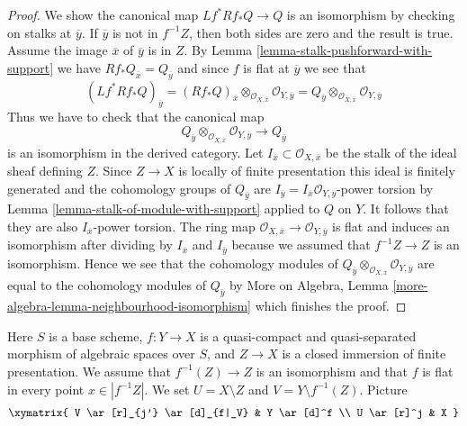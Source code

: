 \begin{proof}
We show the canonical map $Lf^*Rf_*Q \to Q$ is an isomorphism
by checking on stalks at $\overline{y}$. If $\overline{y}$ is not
in $f^{-1}Z$, then both sides are zero and the result is true.
Assume the image $\overline{x}$ of $\overline{y}$ is in $Z$.
By Lemma \ref{lemma-stalk-pushforward-with-support} we have
$Rf_*Q_{\overline{x}} = Q_{\overline{y}}$ and since $f$ is flat
at $\overline{y}$ we see that
$$
(Lf^*Rf_*Q)_{\overline{y}} =
(Rf_*Q)_{\overline{x}}
\otimes_{\mathcal{O}_{X, \overline{x}}}
\mathcal{O}_{Y, \overline{y}} =
Q_{\overline{y}} \otimes_{\mathcal{O}_{X, \overline{x}}}
\mathcal{O}_{Y, \overline{y}}
$$
Thus we have to check that the canonical map
$$
Q_{\overline{y}} \otimes_{\mathcal{O}_{X, \overline{x}}}
\mathcal{O}_{Y, \overline{y}}
\longrightarrow Q_{\overline{y}}
$$
is an isomorphism in the derived category. Let
$I_{\overline{x}} \subset \mathcal{O}_{X, \overline{x}}$ be the
stalk of the ideal sheaf defining $Z$. Since $Z \to X$ is locally of
finite presentation this ideal is finitely generated and the
cohomology groups of $Q_{\overline{y}}$
are $I_{\overline{y}} = I_{\overline{x}}\mathcal{O}_{Y, \overline{y}}$-power
torsion by Lemma \ref{lemma-stalk-of-module-with-support} applied to $Q$ on $Y$.
It follows that they are also $I_{\overline{x}}$-power torsion.
The ring map
$\mathcal{O}_{X, \overline{x}} \to \mathcal{O}_{Y, \overline{y}}$
is flat and induces an isomorphism after dividing by
$I_{\overline{x}}$ and $I_{\overline{y}}$ because we assumed
that $f^{-1}Z \to Z$ is an isomorphism. Hence we see that
the cohomology modules of
$Q_{\overline{y}} \otimes_{\mathcal{O}_{X, \overline{x}}}
\mathcal{O}_{Y, \overline{y}}$
are equal to the cohomology modules of $Q_{\overline{y}}$ by
More on Algebra, Lemma \ref{more-algebra-lemma-neighbourhood-isomorphism}
which finishes the proof.
\end{proof}

\begin{situation}
\label{situation-formal-glueing}
Here $S$ is a base scheme, $f : Y \to X$ is a quasi-compact
and quasi-separated morphism of algebraic spaces over $S$, and
$Z \to X$ is a closed immersion of finite presentation. We assume that
$f^{-1}(Z) \to Z$ is an isomorphism and that $f$ is flat in every
point $x \in |f^{-1}Z|$. We set $U = X \setminus Z$ and
$V = Y \setminus f^{-1}(Z)$.
Picture
$$
\xymatrix{
V \ar[r]_{j'} \ar[d]_{f|_V} & Y \ar[d]^f \\
U \ar[r]^j & X
}
$$
\end{situation}

